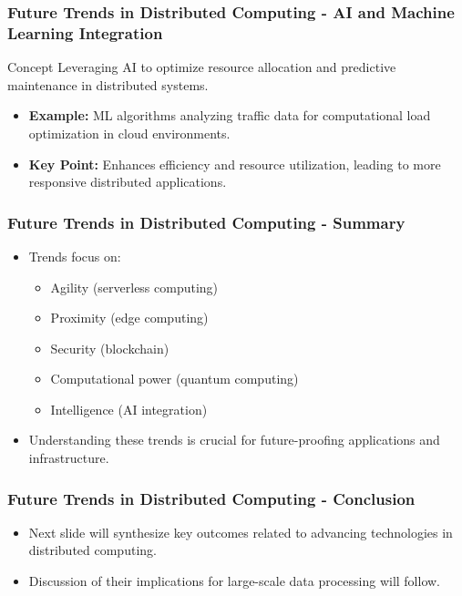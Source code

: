 \documentclass[aspectratio=169]{beamer}
\begin{document}
\begin{frame}[fragile]
    \frametitle{Future Trends in Distributed Computing - AI and Machine Learning Integration}
    \begin{block}{Concept}
        Leveraging AI to optimize resource allocation and predictive maintenance in distributed systems.
    \end{block}
    \begin{itemize}
        \item \textbf{Example:} ML algorithms analyzing traffic data for computational load optimization in cloud environments.
        \item \textbf{Key Point:} Enhances efficiency and resource utilization, leading to more responsive distributed applications.
    \end{itemize}
\end{frame}

\begin{frame}[fragile]
    \frametitle{Future Trends in Distributed Computing - Summary}
    \begin{itemize}
        \item Trends focus on:
        \begin{itemize}
            \item Agility (serverless computing)
            \item Proximity (edge computing)
            \item Security (blockchain)
            \item Computational power (quantum computing)
            \item Intelligence (AI integration)
        \end{itemize}
        \item Understanding these trends is crucial for future-proofing applications and infrastructure.
    \end{itemize}
\end{frame}

\begin{frame}[fragile]
    \frametitle{Future Trends in Distributed Computing - Conclusion}
    \begin{itemize}
        \item Next slide will synthesize key outcomes related to advancing technologies in distributed computing.
        \item Discussion of their implications for large-scale data processing will follow.
    \end{itemize}
\end{frame}
\end{document}
